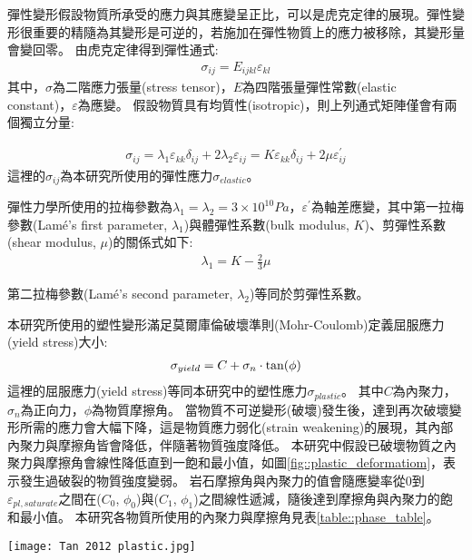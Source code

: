 彈性變形假設物質所承受的應力與其應變呈正比，可以是虎克定律的展現。彈性變形很重要的精隨為其變形是可逆的，若施加在彈性物質上的應力被移除，其變形量會變回零。
由虎克定律得到彈性通式:
\begin{align}
\sigma_{ij}=E_{ijkl} \varepsilon_{kl}
\end{align}
其中，$\sigma$為二階應力張量(stress tensor)，$E$為四階張量彈性常數(elastic constant)，$\varepsilon$為應變。
假設物質具有均質性(isotropic)，則上列通式矩陣僅會有兩個獨立分量:

\begin{align}
    \sigma_{ij}=\lambda_1 \varepsilon_{kk} \delta_{ij}+2 \lambda_2 \varepsilon_{ij}=K\varepsilon_{kk} \delta_{ij}+2 \mu \varepsilon_{ij}^{'} \label{eqn:elastic tensor}
\end{align}
這裡的$\sigma_{ij}$為本研究所使用的彈性應力$\sigma_{elastic}$。

彈性力學所使用的拉梅參數為$\lambda_1 = \lambda_2 = 3 \times 10^{10} Pa$，$\varepsilon^{'}$為軸差應變，其中第一拉梅參數(Lamé's first parameter, $\lambda_1$)與體彈性系數(bulk modulus, $K$)、剪彈性系數(shear modulus, $\mu$)的關係式如下:
\begin{align}
\lambda_1 = K - \frac{2}{3}\mu
\end{align}

第二拉梅參數(Lamé's second parameter, $\lambda_2$)等同於剪彈性系數。

本研究所使用的塑性變形滿足莫爾庫倫破壞準則(Mohr-Coulomb)定義屈服應力(yield stress)大小:
\begin{align}
    \sigma_{yield}=C+\sigma_{n}\cdot{\rm tan}(\phi)\label{eqn:plastic deformation}
\end{align}
這裡的屈服應力(yield stress)等同本研究中的塑性應力$\sigma_{plastic}$。
其中$C$為內聚力，$\sigma_n$為正向力，$\phi$為物質摩擦角。
當物質不可逆變形(破壞)發生後，達到再次破壞變形所需的應力會大幅下降，這是物質應力弱化(strain weakening)的展現，其內部內聚力與摩擦角皆會降低，伴隨著物質強度降低。
本研究中假設已破壞物質之內聚力與摩擦角會線性降低直到一飽和最小值，如圖\ref{fig::plastic_deformatiom}，表示發生過破裂的物質強度變弱。
岩石摩擦角與內聚力的值會隨應變率從0到$\varepsilon_{pl,saturate}$之間在($C_0$, $\phi_0$)與($C_1$, $\phi_1$)之間線性遞減，隨後達到摩擦角與內聚力的飽和最小值。
本研究各物質所使用的內聚力與摩擦角見表\ref{table::phase_table}。
\begin{figure*}[ht!]
    \centering
    \texttt{[image: Tan 2012 plastic.jpg]}
    \caption[應力弱化示意圖，摘自\citet{Tan2012}]{應力弱化示意圖，摘自\citet{Tan2012}。在應變率為$0$時，岩石摩擦角與內聚力分別為$C_0$, $\phi_0$; 在應變率大於$\varepsilon_{pl,saturate}$時，岩石摩擦角與內聚力分別為$C_1$, $\phi_1$。摩擦角與內聚力的值會隨應變率變化在($C_0$, $\phi_0$)與($C_1$, $\phi_1$)之間線性遞減。
    }
    \label{fig::plastic_deformatiom}
\end{figure*}

